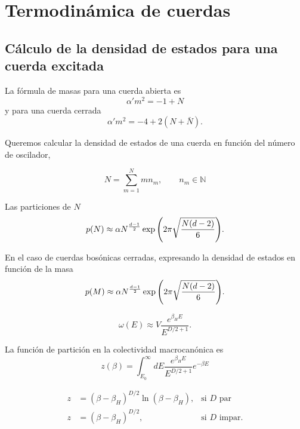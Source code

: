 \chapter{Termodinámica de cuerdas}

\section{Cálculo de la densidad de estados para una cuerda excitada}

La fórmula de masas para una cuerda abierta es
\begin{equation}
  \alpha' m^2=-1+N
\end{equation}
y para una cuerda cerrada
\begin{equation}
  \alpha' m^2=-4+2(N+\bar N).
\end{equation}

Queremos calcular la densidad de estados de una cuerda en función del número de 
oscilador, 

\begin{equation}
  N=\sum_{m=1}^N m n_m, \qquad n_m\in\mathbb N
\end{equation}

Las particiones de $N$
\begin{equation}
  p(N)\approx \alpha N^ {\frac{d-1}{2}}\exp\qty(2\pi\sqrt{\frac{N(d-2)}{6}}).
\end{equation}

En el caso de cuerdas bosónicas cerradas, expresando la densidad de estados en función de la masa
\begin{equation}
  p(M)\approx \alpha N^ {\frac{d-1}{2}}\exp\qty(2\pi\sqrt{\frac{N(d-2)}{6}}).
\end{equation}


\begin{equation}
  \omega(E) \approx V \frac{e^{\beta_H E}}{E^{D/2+1}}.
\end{equation}

La función de partición en la colectividad macrocanónica es
\begin{equation}
  z(\beta)=\int^\infty_{E_0} dE \frac{e^{\beta_H E}}{{E^{D/2+1}}}e^{-\beta E}
\end{equation}

\begin{equation}
  \begin{aligned}
    z&=(\beta-\beta_H)^{D/2}\ln(\beta-\beta_H), &\text{si $D$ par}\\
    z&=(\beta-\beta_H)^{D/2}, &\text{si $D$ impar}.
  \end{aligned}
\end{equation}

